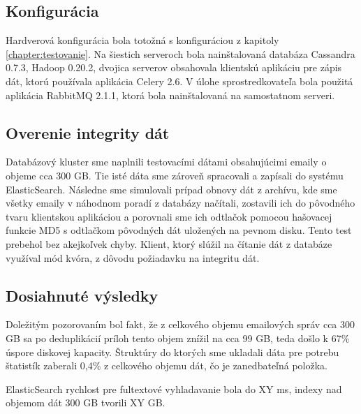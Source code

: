 \documentclass[11pt,twoside,a4paper]{book}
\begin{document}
\subsection*{Konfigurácia}
Hardverová konfigurácia bola totožná s konfiguráciou z kapitoly \ref{chapter:testovanie}. Na šiestich serveroch bola nainštalovaná databáza Cassandra 0.7.3, Hadoop 0.20.2, dvojica serverov obsahovala klientskú aplikáciu pre zápis dát, ktorú používala aplikácia Celery 2.6. V úlohe sprostredkovateľa bola použitá aplikácia RabbitMQ 2.1.1, ktorá bola nainštalovaná na samostatnom serveri.


\subsection*{Overenie integrity dát}
Databázový kluster sme naplnili testovacími dátami obsahujúcimi emaily o objeme cca 300 GB. Tie isté dáta sme zároveň spracovali a zapísali do systému ElasticSearch. Následne sme simulovali prípad obnovy dát z archívu, kde sme všetky emaily v náhodnom poradí z databázy načítali, zostavili ich do pôvodného tvaru klientskou aplikáciou a porovnali sme ich odtlačok pomocou hašovacej funkcie MD5 s odtlačkom pôvodných dát uložených na pevnom disku. Tento test prebehol bez akejkoľvek chyby. 
Klient, ktorý slúžil na čítanie dát z databáze využíval mód kvóra, z dôvodu požiadavku na integritu dát.


\subsection*{Dosiahnuté výsledky}
Doležitým pozorovaním bol fakt, že z celkového objemu emailových správ cca 300 GB sa po deduplikácií príloh tento objem znížil na cca 99 GB, teda došlo k 67\% úspore diskovej kapacity. Štruktúry do ktorých sme ukladali dáta pre potrebu štatistík zaberali 0,4\% z celkového objemu dát, čo je zanedbateľná položka.

\noindent
ElasticSearch rychlost pre fultextové vyhladavanie bola do XY ms, indexy nad objemom dát 300 GB tvorili XY GB.



\end{document}
